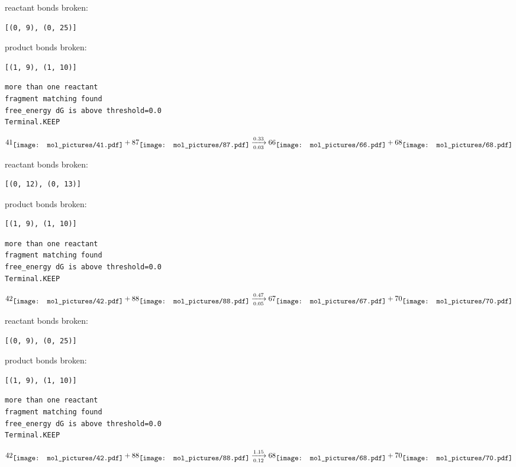 \documentclass{article}
\begin{document}
reactant bonds broken:\begin{verbatim}
[(0, 9), (0, 25)]
\end{verbatim}
product bonds broken:\begin{verbatim}
[(1, 9), (1, 10)]
\end{verbatim}




\vspace{1cm}
\begin{verbatim}
more than one reactant
fragment matching found
free_energy dG is above threshold=0.0
Terminal.KEEP
\end{verbatim}
$$
41
\raisebox{-.5\height}{\texttt{[image: mol\_pictures/41.pdf]}}
+
87
\raisebox{-.5\height}{\texttt{[image: mol\_pictures/87.pdf]}}
\xrightarrow[0.03]{0.33}
66
\raisebox{-.5\height}{\texttt{[image: mol\_pictures/66.pdf]}}
+
68
\raisebox{-.5\height}{\texttt{[image: mol\_pictures/68.pdf]}}
$$


reactant bonds broken:\begin{verbatim}
[(0, 12), (0, 13)]
\end{verbatim}
product bonds broken:\begin{verbatim}
[(1, 9), (1, 10)]
\end{verbatim}




\vspace{1cm}
\begin{verbatim}
more than one reactant
fragment matching found
free_energy dG is above threshold=0.0
Terminal.KEEP
\end{verbatim}
$$
42
\raisebox{-.5\height}{\texttt{[image: mol\_pictures/42.pdf]}}
+
88
\raisebox{-.5\height}{\texttt{[image: mol\_pictures/88.pdf]}}
\xrightarrow[0.05]{0.47}
67
\raisebox{-.5\height}{\texttt{[image: mol\_pictures/67.pdf]}}
+
70
\raisebox{-.5\height}{\texttt{[image: mol\_pictures/70.pdf]}}
$$


reactant bonds broken:\begin{verbatim}
[(0, 9), (0, 25)]
\end{verbatim}
product bonds broken:\begin{verbatim}
[(1, 9), (1, 10)]
\end{verbatim}




\vspace{1cm}
\begin{verbatim}
more than one reactant
fragment matching found
free_energy dG is above threshold=0.0
Terminal.KEEP
\end{verbatim}
$$
42
\raisebox{-.5\height}{\texttt{[image: mol\_pictures/42.pdf]}}
+
88
\raisebox{-.5\height}{\texttt{[image: mol\_pictures/88.pdf]}}
\xrightarrow[0.12]{1.15}
68
\raisebox{-.5\height}{\texttt{[image: mol\_pictures/68.pdf]}}
+
70
\raisebox{-.5\height}{\texttt{[image: mol\_pictures/70.pdf]}}
$$
\end{document}

